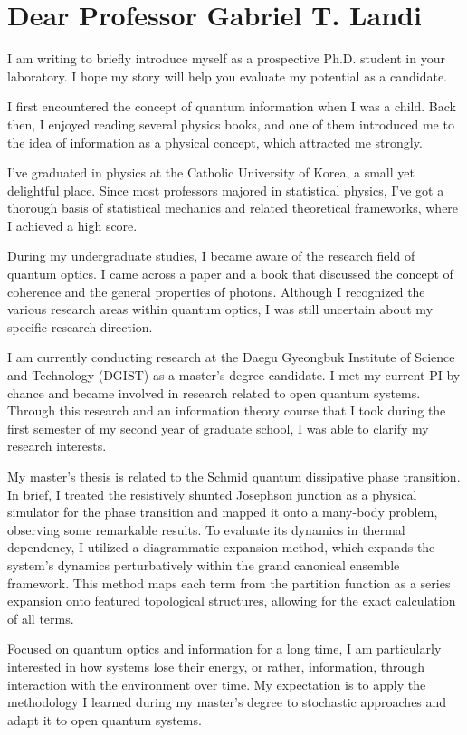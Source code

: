\documentclass[10pt,a4paper]{article}
\begin{document}
\section*{Dear Professor Gabriel T. Landi}
\begin{spacing}{1.5}
I am writing to briefly introduce myself as a prospective Ph.D. student in your laboratory. I hope my story will help you evaluate my potential as a candidate.

I first encountered the concept of quantum information when I was a child. Back then, I enjoyed reading several physics books, and one of them introduced me to the idea of information as a physical concept, which attracted me strongly.

I've graduated in physics at the Catholic University of Korea, a small yet delightful place. Since most professors majored in statistical physics, I've got a thorough basis of statistical mechanics and related theoretical frameworks, where I achieved a high score.

During my undergraduate studies, I became aware of the research field of quantum optics. I came across a paper and a book that discussed the concept of coherence and the general properties of photons. Although I recognized the various research areas within quantum optics, I was still uncertain about my specific research direction.

I am currently conducting research at the Daegu Gyeongbuk Institute of Science and Technology (DGIST) as a master's degree candidate. I met my current PI by chance and became involved in research related to open quantum systems. Through this research and an information theory course that I took during the first semester of my second year of graduate school, I was able to clarify my research interests.

My master's thesis is related to the Schmid quantum dissipative phase transition. In brief, I treated the resistively shunted Josephson junction as a physical simulator for the phase transition and mapped it onto a many-body problem, observing some remarkable results. To evaluate its dynamics in thermal dependency, I utilized a diagrammatic expansion method, which expands the system's dynamics perturbatively within the grand canonical ensemble framework. This method maps each term from the partition function as a series expansion onto featured topological structures, allowing for the exact calculation of all terms.

Focused on quantum optics and information for a long time, I am particularly interested in how systems lose their energy, or rather, information, through interaction with the environment over time. My expectation is to apply the methodology I learned during my master's degree to stochastic approaches and adapt it to open quantum systems.
\end{spacing}
\end{document}
